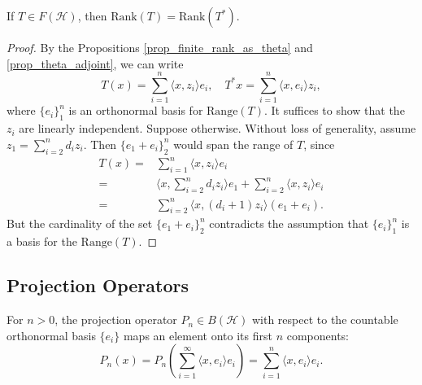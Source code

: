 \documentclass[12pt]{article}
\begin{document}
\begin{corollary}
	If $T\in F(\mathcal{H})$, then $\text{Rank}(T) = \text{Rank}(T^\ast)$.
\end{corollary}
\begin{proof}
	By the Propositions \ref{prop_finite_rank_as_theta} and \ref{prop_theta_adjoint}, we can write 
	\begin{equation*}
		T(x)=\sum_{i=1}^n\langle x, z_i\rangle e_i,\quad T^\ast x=\sum_{i=1}^n\langle x, e_i\rangle z_i,
	\end{equation*}
	where $\{e_i\}_1^n$ is an orthonormal basis for $\text{Range}(T)$. It suffices to show that the $z_i$ are linearly independent. Suppose otherwise. Without loss of generality, assume $z_1=\sum_{i=2}^n d_iz_i$. Then $\{e_1+e_i\}_{2}^n$ would span the range of $T$, since
	\begin{align*}
		T(x) =& \sum_{i=1}^n \langle x, z_i \rangle e_i \\
		=& \langle x, \sum_{i=2}^n d_iz_i \rangle e_1 + \sum_{i=2}^n \langle x, z_i \rangle e_i \\
		=& \sum_{i=2}^n \langle x, (d_i+1)z_i\rangle (e_1 + e_i).
	\end{align*}
	But the cardinality of the set $\{e_1 + e_i\}_2^n$ contradicts the assumption that $\{e_i\}_{1}^n$ is a basis for the $\text{Range}(T)$.
\end{proof}


\subsection{Projection Operators} %

For $n>0$, the projection operator $P_n\in B(\mathcal{H})$ with respect to the countable orthonormal basis $\{e_i\}$ maps an element onto its first $n$ components: 
\begin{equation*}
	P_n(x)=P_n\left(\sum_{i=1}^\infty \langle x,e_i \rangle e_i\right) = \sum_{i=1}^n \langle x, e_i \rangle e_i.
\end{equation*} 
\end{document}
